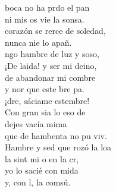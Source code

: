 \documentclass[12pt]{article}
\begin{document}
\begin{multicols*}{2}
\begin{cancion}%
	 boca no ha prdo el pan\\
	ni mis os vie la sonsa.\\
	 corazón se rerce de soledad,\\
	nunca nie lo apañ. \\
	ngo hambre de luz y soso,\\
	¡De laida! y ser mi deino,\\
	de abandonar mi combre\\
	y nor que este bre pa. \\
	¡dre, sáciame estembre! \\
	Con gran sia lo eso de \\
	 dejes vacía mima\\
	que de hambenta no pu viv.\\
	Hambre y sed que rozó la loa\\
	la sint mi o en la cr, \\
	yo lo sacié con mida\\
	y, con l, la comsú. \\
\end{cancion}%


\end{multicols*}
\end{document}
